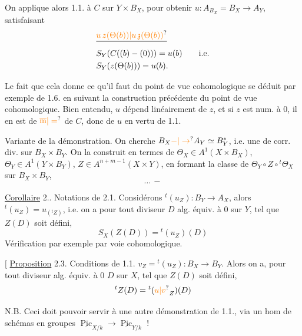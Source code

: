 On applique alors 1.1. à $C$ sur $Y\times B_X$, pour obtenir $u:A_{B_X}=B_X\longrightarrow A_Y$, satisfaisant
\[
\begin{aligned}
&\deleted{\unsure{u\,z(\Theta(b))|u\,\mathfrak{z}(\Theta(b))}}\\
&S_Y(C((b)-(0)))=u(b)\qquad\text{i.e.}\\
&S_Y(z(\Theta(b)))=u(b).
\end{aligned}
\]

Le fait que cela donne ce qu'il faut du point de vue cohomologique se déduit par exemple de 1.6. en suivant la construction précédente du point de vue cohomologique. Bien entendu, $u$ dépend linéairement de $z$, et si $z$ est num.  à $0$, il en est de $\unsure{\overline{\mathrm m}|=}$ de $C$, donc de $u$ en vertu de 1.1.

Variante de la démonstration. On cherche $B_X\unsure{\mathord{-}|\to} A_Y\simeq B_Y^*$, i.e. une  de corr. div. sur $B_X\times B_Y$. On la construit en termes de $\Theta_X\in A^1(X\times B_X)$, $\Theta_Y\in A^1(Y\times B_Y)$, $Z\in A^{n+m-1}(X\times Y)$,  en formant la classe de  $\Theta_Y\circ Z\circ{}^t\Theta_X$ sur $B_X\times B_Y$,
\[
\ldots\,-
\]


\uline{Corollaire} 2.. \margin{\rule[-2.8\baselineskip]{0.45pt}{3.5\baselineskip}}Notations de 2.1. Considérons $ {}^t(u_Z):B_Y\longrightarrow A_X$, alors $ {}^t(u_Z)=u_{({}^tZ)}$, i.e. on a pour tout diviseur $D$ alg. équiv. à $0$ sur $Y$, tel que $Z(D)$ soit défini,
\[
S_X(Z(D))={}^t(u_Z)(D)
\]
Vérification par exemple par voie cohomologique.

$[$ \uline{Proposition} 2.3. Conditions de 1.1.  $v_Z={}^t(u_Z):B_X\longrightarrow B_Y$. Alors on a, pour tout diviseur alg. équiv. à $0$ $D$ sur $X$, tel que $Z(D)$ soit défini,
\[
{}^tZ(D)={}^t(\unsure{u|v}_Z)(D)
\]

N.B. Ceci doit pouvoir servir à une autre démonstration de 1.1., via un hom de schémas en groupes $\underline{\operatorname{Pic}}_{X/k}\longrightarrow\underline{\operatorname{Pic}}_{Y/k}$ !

